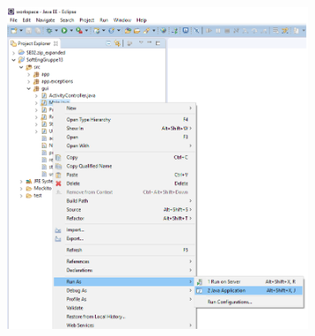 \begin{figure}[H]
    \centering
    \includegraphics[width = 0.8\textwidth]{Figurer/Guide/RunAsJavaApplication.png}
\end{figure}